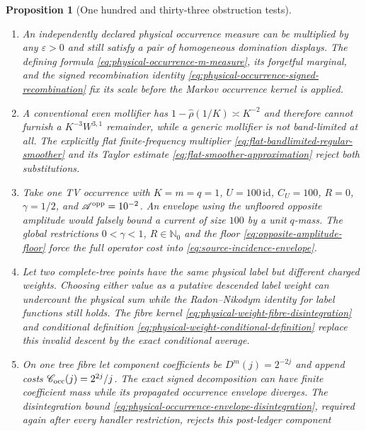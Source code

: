 \documentclass[11pt]{article}
\newtheorem{proposition}[theorem]{Proposition}
\begin{document}
\begin{proposition}[One hundred and thirty-three obstruction tests]
\begin{enumerate}[label=\textup{(T\arabic*)}]
      weight has no $L^{1+\epsilon}$ margin.  The factor
      $(1+\rho_{\rm PT})$ in
      \eqref{eq:full-mark-cemetery-domination}--
      \eqref{eq:proved-full-product-Lp} controls both laws and rejects the
      model.
\item An independently declared physical occurrence measure can be
      multiplied by any $\varepsilon>0$ and still satisfy a pair of
      homogeneous domination displays.  The defining formula
      \eqref{eq:physical-occurrence-m-measure}, its forgetful marginal, and
      the signed recombination identity
      \eqref{eq:physical-occurrence-signed-recombination} fix its scale
      before the Markov occurrence kernel is applied.
\item A conventional even mollifier has
      $1-\widehat\rho(1/K)\asymp K^{-2}$ and therefore cannot furnish a
      $K^{-3}W^{3,1}$ remainder, while a generic mollifier is not
      band-limited at all.  The explicitly flat finite-frequency multiplier
      \eqref{eq:flat-bandlimited-regular-smoother} and its Taylor estimate
      \eqref{eq:flat-smoother-approximation} reject both substitutions.
\item Take one TV occurrence with $K=m=q=1$, $U=100\,\mathrm{id}$,
      $C_U=100$, $R=0$, $\gamma=1/2$, and
      $\mathscr A^{\rm opp}=10^{-2}$.  An envelope using the unfloored
      opposite amplitude would falsely bound a current of size $100$ by a
      unit $q$-mass.  The global restrictions $0<\gamma<1$, $R\in\mathbb N_0$
      and the floor \eqref{eq:opposite-amplitude-floor} force the full
      operator cost into \eqref{eq:source-incidence-envelope}.
\item Let two complete-tree points have the same physical label but different
      charged weights.  Choosing either value as a putative descended label
      weight can undercount the physical sum while the Radon--Nikodym identity
      for label functions still holds.  The fibre kernel
      \eqref{eq:physical-weight-fibre-disintegration} and conditional
      definition \eqref{eq:physical-weight-conditional-definition} replace
      this invalid descent by the exact conditional average.
\item On one tree fibre let component coefficients be
      $D^m(j)=2^{-2j}$ and append costs
      $\mathscr C_{\rm occ}(j)=2^{2j}/j$.  The exact signed decomposition can
      have finite coefficient mass while its propagated occurrence envelope
      diverges.  The disintegration bound
      \eqref{eq:physical-occurrence-envelope-disintegration}, required again
      after every handler restriction, rejects this post-ledger component

\end{enumerate}
\end{proposition}
\end{document}
